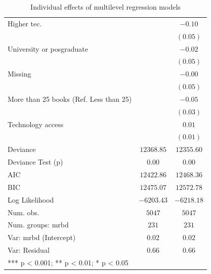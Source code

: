 \documentclass[
  letterpaper,
  DIV=11,
  numbers=noendperiod]{scrartcl}
\begin{document}
\begin{table}
\begin{center}
\begin{tabular}{l c c}
\quad Higher tec.                            &               & $-0.10$       \\
                                             &               & $(0.05)$      \\
\quad University or posgraduate              &               & $-0.02$       \\
                                             &               & $(0.05)$      \\
\quad Missing                                &               & $-0.00$       \\
                                             &               & $(0.05)$      \\
More than 25 books (Ref. Less than 25)       &               & $-0.05$       \\
                                             &               & $(0.03)$      \\
Technology access                            &               & $0.01$        \\
                                             &               & $(0.01)$      \\
\hline
Deviance                                     & $12368.85$    & $12355.60$    \\
Deviance Test (p)                            & $0.00$        & $0.00$        \\
AIC                                          & $12422.86$    & $12468.36$    \\
BIC                                          & $12475.07$    & $12572.78$    \\
Log Likelihood                               & $-6203.43$    & $-6218.18$    \\
Num. obs.                                    & $5047$        & $5047$        \\
Num. groups: mrbd                            & $231$         & $231$         \\
Var: mrbd (Intercept)                        & $0.02$        & $0.02$        \\
Var: Residual                                & $0.66$        & $0.66$        \\
\hline
\multicolumn{3}{l}{\scriptsize{*** p < 0.001; ** p < 0.01; * p < 0.05}}
\end{tabular}
\caption{\label{tbl-individual-reg}Individual effects of multilevel regression models }
\label{table:coefficients}
\end{center}
\end{table}
\end{document}
